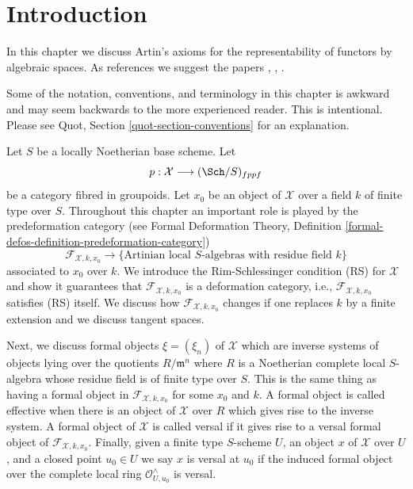\section{Introduction}
\label{artin-section-introduction}
In this chapter we discuss Artin's axioms for the representability of
functors by algebraic spaces. As references we suggest the papers
\cite{ArtinI}, \cite{ArtinII}, \cite{ArtinVersal}.

\medskip\noindent
Some of the notation, conventions, and terminology in this chapter is awkward
and may seem backwards to the more experienced reader. This is intentional.
Please see Quot, Section \ref{quot-section-conventions} for an
explanation.

\medskip\noindent
Let $S$ be a locally Noetherian base scheme. Let
$$
p : \mathcal{X} \longrightarrow (\Sch/S)_{fppf}
$$
be a category fibred in groupoids. Let $x_0$ be an object of $\mathcal{X}$
over a field $k$ of finite type over $S$. Throughout this chapter an important
role is played by the predeformation category
(see Formal Deformation Theory,
Definition \ref{formal-defos-definition-predeformation-category})
$$
\mathcal{F}_{\mathcal{X}, k, x_0}
\longrightarrow
\{\text{Artinian local }S\text{-algebras with residue field }k\}
$$
associated to $x_0$ over $k$. We introduce the Rim-Schlessinger condition (RS)
for $\mathcal{X}$ and show it guarantees that
$\mathcal{F}_{\mathcal{X}, k, x_0}$ is a deformation category, i.e.,
$\mathcal{F}_{\mathcal{X}, k, x_0}$ satisfies (RS) itself.
We discuss how $\mathcal{F}_{\mathcal{X}, k, x_0}$
changes if one replaces $k$ by a finite extension
and we discuss tangent spaces.

\medskip\noindent
Next, we discuss formal objects $\xi = (\xi_n)$ of $\mathcal{X}$ which are
inverse systems of objects lying over the quotients $R/\mathfrak m^n$
where $R$ is a Noetherian complete local $S$-algebra whose residue field
is of finite type over $S$. This is the same thing as having a formal
object in $\mathcal{F}_{\mathcal{X}, k, x_0}$ for some $x_0$ and $k$.
A formal object is called effective when there is an object of
$\mathcal{X}$ over $R$ which gives rise to the inverse system.
A formal object of $\mathcal{X}$ is called versal if it gives rise to a
versal formal object of $\mathcal{F}_{\mathcal{X}, k, x_0}$.
Finally, given a finite type $S$-scheme $U$, an object $x$
of $\mathcal{X}$ over $U$, and a closed point $u_0 \in U$ we say
$x$ is versal at $u_0$ if the induced formal object over the complete
local ring $\mathcal{O}_{U, u_0}^\wedge$ is versal.

